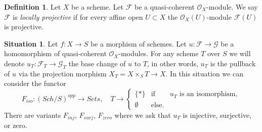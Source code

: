 \documentclass{amsart}
\theoremstyle{plain}
\theoremstyle{definition}
\newtheorem{definition}[subsection]{Definition}
\newtheorem{situation}[subsection]{Situation}
\theoremstyle{remark}
\numberwithin{equation}{subsection}
\def\Sch{\mathit{Sch}}
\begin{document}
\begin{definition}
\label{properties-definition-locally-projective}
Let $X$ be a scheme. Let $\mathcal{F}$ be a quasi-coherent
$\mathcal{O}_X$-module. We say $\mathcal{F}$ is {\it locally projective}
if for every affine open $U \subset X$ the $\mathcal{O}_X(U)$-module
$\mathcal{F}(U)$ is projective.
\end{definition}

\begin{situation}
\label{situation-iso}
Let $f : X \to S$ be a morphism of schemes.
Let $u : \mathcal{F} \to \mathcal{G}$ be a homomorphism of
quasi-coherent $\mathcal{O}_X$-modules. For any scheme $T$ over
$S$ we will denote $u_T : \mathcal{F}_T \to \mathcal{G}_T$ the
base change of $u$ to $T$, in other words, $u_T$ is the pullback
of $u$ via the projection morphism $X_T = X \times_S T \to X$.
In this situation we can consider the functor
\begin{equation}
\label{equation-iso}
F_{iso} : (\Sch/S)^{opp} \longrightarrow \textit{Sets}, \quad
T \longrightarrow \left\{
\begin{matrix}
\{*\} & \text{if} & u_T \text{ is an isomorphism}, \\
\emptyset & \text{else.} &
\end{matrix}
\right.
\end{equation}
There are variants $F_{inj}$, $F_{surj}$, $F_{zero}$ where we ask that
$u_T$ is injective, surjective, or zero.
\end{situation}
\end{document}
